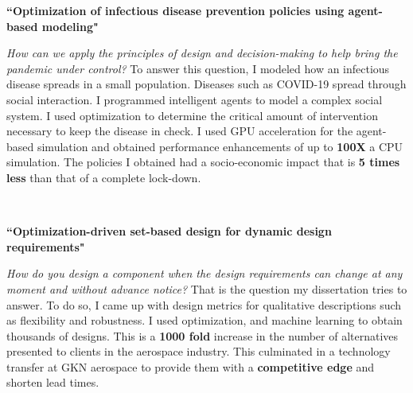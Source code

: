 \documentclass[10pt]{article} %
\begin{document}
{\raggedright\textbf{``Optimization of infectious disease prevention policies using agent-based modeling"}}
\textit{\center How can we apply the principles of design and decision-making to help bring the pandemic under control?}
To answer this question, I modeled how an infectious disease spreads in a small population. Diseases such as COVID-19 spread through social interaction. I programmed intelligent agents to model a complex social system. I used optimization to determine the critical amount of intervention necessary to keep the disease in check. I used GPU acceleration for the agent-based simulation and obtained performance enhancements of up to \textbf{100X} a CPU simulation. The policies I obtained had a socio-economic impact that is \textbf{5 times less} than that of a complete lock-down.

~~~~

\medskip %

{\raggedright\textbf{``Optimization-driven set-based design for dynamic design requirements"}}
\textit{\center How do you design a component when the design requirements can change at any moment and without advance notice?}
That is the question my dissertation tries to answer. To do so, I came up with design metrics for qualitative descriptions such as flexibility and robustness. I used optimization, and machine learning to obtain thousands of designs. This is a \textbf{1000 fold} increase in the number of alternatives presented to clients in the aerospace industry. This culminated in a technology transfer at GKN aerospace to provide them with a \textbf{competitive edge} and shorten lead times.

~~~~~

\medskip %

\end{document}
